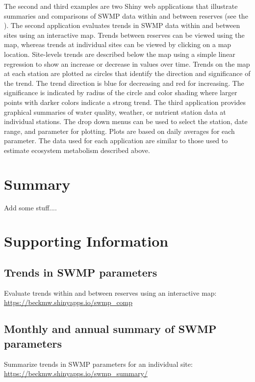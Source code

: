 \documentclass[10pt,letterpaper]{article}\usepackage[]{graphicx}\usepackage[]{color}
\begin{document}
The second and third examples are two Shiny web applications \cite{Chang15} that illustrate summaries and comparisons of \ac{SWMP} data within and between reserves (see the ).  The second application evaluates trends in \ac{SWMP} data within and between sites using an interactive map.  Trends between reserves can be viewed using the map, whereas trends at individual sites can be viewed by clicking on a map location.  Site-levels trends are described below the map using a simple linear regression to show an increase or decrease in values over time.  Trends on the map at each station are plotted as circles that identify the direction and significance of the trend.  The trend direction is blue for decreasing and red for increasing.  The significance is indicated by radius of the circle and color shading where larger points with darker colors indicate a strong trend.  The third application provides graphical summaries of water quality, weather, or nutrient station data at individual stations. The drop down menus can be used to select the station, date range, and parameter for plotting. Plots are based on daily averages for each parameter.  The data used for each application are similar to those used to estimate ecosystem metabolism described above.  

\section*{Summary}

Add some stuff....

\section*{Supporting Information}
\label{supp_info}

\subsection*{Trends in \ac{SWMP} parameters}
\label{swmp_trends}
Evaluate trends within and between reserves using an interactive map: \href{https://beckmw.shinyapps.io/swmp_comp}{https://beckmw.shinyapps.io/swmp\_comp}

\subsection*{Monthly and annual summary of \ac{SWMP} parameters}
\label{swmp_summary}
Summarize trends in \ac{SWMP} parameters for an individual site: \href{https://beckmw.shinyapps.io/swmp_summary/}{https://beckmw.shinyapps.io/swmp\_summary/} 
\end{document}
